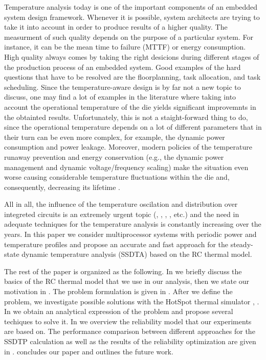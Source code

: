 Temperature analysis today is one of the important components of an embedded system design framework. Whenever it is possible, system architects are trying to take it into account in order to produce results of a higher quality. The measurment of such quality depends on the purpose of a particular system. For instance, it can be the mean time to failure (MTTF) or energy consumption. High quality always comes by taking the right desicions during different stages of the production process of an embedded system. Good examples of the hard questions that have to be resolved are the floorplanning, task allocation, and task scheduling. Since the temperature-aware design is by far not a new topic to discuss, one may find a lot of examples in the literature where taking into account the operational temperature of the die yields significant improvemnts in the obtainted results. Unfortunately, this is not a staight-forward thing to do, since the operational temperature depends on a lot of different parameters that in their turn can be even more complex, for example, the dynamic power consumption and power leakage. Moreover, modern policies of the temperature runaway prevention and energy conservation (e.g., the dynamic power management and dynamic voltage/frequency scaling) make the situation even worse causing considerable temperature fluctuations within the die and, consequently, decreasing its lifetime \cite{simunic2005}.

All in all, the influence of the temperature oscilation and distribution over integreted circuits is an extremely urgent topic (\cite{hieu2004}, \cite{lu2004}, \cite{jedec2010}, \cite{xiang2010}, etc.) and the need in adequate techniques for the temperature analysis is constantly increasing over the years. In this paper we consider multiprocessor systems with periodic power and temperature profiles and propose an accurate and fast approach for the steady-state dynamic temperature analysis (SSDTA) based on the RC thermal model.

The rest of the paper is organized as the following. In  we briefly discuss the basics of the RC thermal model that we use in our analysis, then we state our motivation in . The problem formulation is given in . After we define the problem, we investigate possible solutions with the HotSpot thermal simulator \cite{huang2006}, . In  we obtain an analytical expression of the problem and propose several techiques to solve it. In  we overview the reliability model that our experiments are based on. The performance comparison between different approaches for the SSDTP calculation as well as the results of the reliability optimization are given in .  concludes our paper and outlines the future work.
